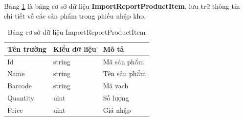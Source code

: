 \documentclass[../DoAn.tex]{subfiles}
\begin{document}
Bảng \ref{table:database_importreportproductitem} là bảng cơ sở dữ liệu \textbf{ImportReportProductItem}, lưu trữ thông tin chi tiết về các sản phẩm trong phiếu nhập kho.
\begin{table}[H]
    \centering
    \begin{tabularx}{\textwidth}{|p{4cm}|p{3cm}|X|}
        \hline
        \textbf{Tên trường} & \textbf{Kiểu dữ liệu} & \textbf{Mô tả} \\ \hline
        Id                  & string                & Mã sản phẩm    \\ \hline
        Name                & string                & Tên sản phẩm   \\ \hline
        Barcode             & string                & Mã vạch        \\ \hline
        Quantity            & uint                  & Số lượng       \\ \hline
        Price               & uint                  & Giá nhập       \\ \hline
    \end{tabularx}
    \caption{Bảng cơ sở dữ liệu ImportReportProductItem}
    \label{table:database_importreportproductitem}
\end{table}
\end{document}
